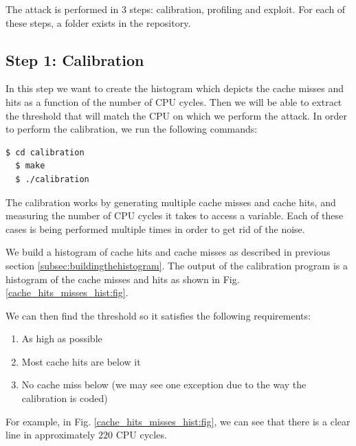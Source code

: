 The attack is performed in 3 steps: calibration, profiling and exploit. For each of these steps, a folder exists in the repository.

\subsection{Step 1: Calibration}
In this step we want to create the histogram which depicts the cache misses and hits as a function of the number of CPU cycles. Then we will be able to extract the threshold that will match the CPU on which we perform the attack.
In order to perform the calibration, we run the following commands:

\begin{lstlisting}[language=bash]
  $ cd calibration
  $ make
  $ ./calibration
\end{lstlisting}

The calibration works by generating multiple cache misses and cache hits, and measuring the number of CPU cycles it takes to access a variable. Each of these cases is being performed multiple times in order to get rid of the noise.

\noindent We build a histogram of cache hits and cache misses as described in previous section \ref{subsec:buildingthehistogram}. The output of the calibration program is a histogram of the cache misses and hits as shown in Fig. \ref{cache_hits_misses_hist:fig}.

We can then find the threshold so it satisfies the following requirements:
\begin{enumerate}
    \item As high as possible
    \item Most cache hits are below it
    \item No cache miss below (we may see one exception due to the way the calibration is coded)
\end{enumerate}

For example, in Fig. \ref{cache_hits_misses_hist:fig}, we can see that there is a clear line in approximately $220$ CPU cycles.


